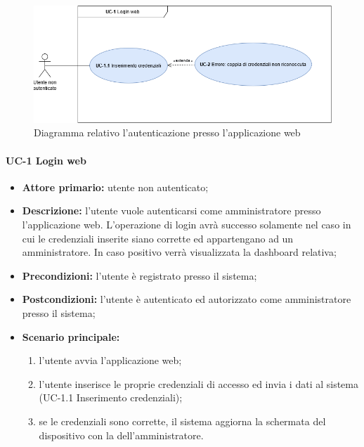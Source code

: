 \begin{figure}[H]
    \centering
      \includegraphics[scale=0.50]{src/CasiDUso/immagini/LoginWeb.png}
    \caption{Diagramma relativo l'autenticazione presso l'applicazione web}
\end{figure}

\paragraph{UC-1 Login web}
\begin{itemize}
	\item \textbf{Attore primario:} utente non autenticato; 

	\item \textbf{Descrizione:} l'utente vuole autenticarsi come amministratore presso l'applicazione web. L'operazione di login avrà successo solamente nel caso in cui le credenziali inserite siano corrette ed appartengano ad un amministratore. In caso positivo verrà visualizzata la dashboard relativa;

	\item \textbf{Precondizioni:} l'utente è registrato presso il sistema;

	\item \textbf{Postcondizioni:} l'utente è autenticato ed autorizzato come amministratore presso il sistema;

	\item \textbf{Scenario principale:}
	      \begin{enumerate}
		      \item l'utente avvia l'applicazione web;
		      \item l'utente inserisce le proprie credenziali di accesso ed invia i dati al sistema (UC-1.1 Inserimento credenziali);
		      \item se le credenziali sono corrette, il sistema aggiorna la schermata del dispositivo con la  dell'amministratore.
	      \end{enumerate}
\end{itemize}

